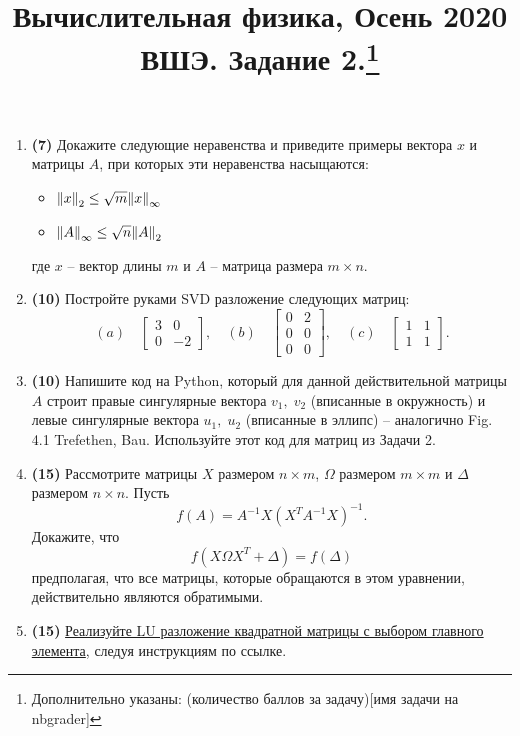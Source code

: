 \documentclass[prb,papersize=a4paper,notitlepage]{revtex4-1}%
\begin{document}
\title{Вычислительная физика, Осень 2020 ВШЭ. Задание 2.\footnote{Дополнительно указаны: (количество баллов за задачу)[имя задачи на nbgrader]}}
\maketitle


\begin{enumerate}
\item \textbf{(7)} Докажите следующие неравенства и приведите примеры вектора $x$ и матрицы $A$, при которых эти неравенства насыщаются:
\begin{itemize}
\item $\norm{x}_2 \le \sqrt{m}\norm{x}_\infty$
\item $\norm{A}_\infty \le \sqrt{n} \norm{A}_2$
\end{itemize}
где $x$ -- вектор длины $m$ и $A$ -- матрица размера $m\times n$.

\item \textbf{(10)} Постройте руками SVD разложение следующих матриц:
$$
(a)\quad\begin{bmatrix}
3 & 0\\
0 & -2
\end{bmatrix},\quad
(b)\quad\begin{bmatrix}
0 & 2\\
0 & 0\\
0 & 0
\end{bmatrix},\quad
(c)\quad\begin{bmatrix}
1 & 1\\
1 & 1
\end{bmatrix}.
$$

\item \textbf{(10)} Напишите код на Python, который для данной действительной матрицы $A$ строит правые сингулярные вектора $v_1,\; v_2$ (вписанные в окружность) и  левые сингулярные вектора $u_1,\; u_2$ (вписанные в эллипс) -- аналогично Fig. 4.1 Trefethen, Bau. Используйте этот код для матриц из Задачи 2.

\item \textbf{(15)} Рассмотрите матрицы $X$ размером $n\times m$, $ \Omega$ размером $m\times m$ и $ \Delta$ размером $n\times n$. Пусть
$$
f(A) = A^{-1}X(X^T A^{-1}X)^{-1}.
$$
Докажите, что $$f(X \Omega X^T + \Delta)=f(\Delta)$$
предполагая, что все матрицы, которые обращаются в этом уравнении, действительно являются обратимыми.

\item \textbf{(15)} \href{https://github.com/ev-br/CP2020/blob/master/week_1_LU_pivoting.ipynb}{Реализуйте LU разложение квадратной матрицы с выбором главного элемента}, следуя инструкциям по ссылке.


\end{enumerate}
\end{document}
